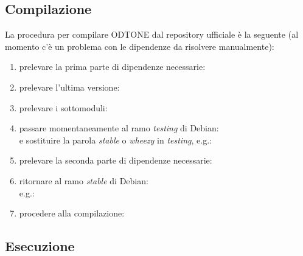 \subsection{Compilazione}
La procedura per compilare ODTONE dal repository ufficiale è la seguente (al momento c'è un problema con le dipendenze da risolvere manualmente\cite{snapshot}):
\begin{enumerate}

\item prelevare la prima parte di dipendenze necessarie:\\

\item prelevare l'ultima versione:\\

\item prelevare i sottomoduli:\\

\item passare momentaneamente al ramo {\em testing} di Debian:\\
e sostituire la parola {\em stable} o {\em wheezy} in {\em testing}, e.g.:\\

\item prelevare la seconda parte di dipendenze necessarie:\\

\item ritornare al ramo {\em stable} di Debian:\\
e.g.:\\

\item procedere alla compilazione:\\

\end{enumerate}

\subsection{Esecuzione}

